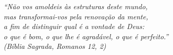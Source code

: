 \begin{epigrafe}
    \vspace*{\fill}
	\begin{flushright}
		\textit{``Não vos amoldeis às estruturas deste mundo, \\
		mas transformai-vos pela renovação da mente, \\
		a fim de distinguir qual é a vontade de Deus: \\
		o que é bom, o que lhe é agradável, o que é perfeito.''\\
		(Bíblia Sagrada, Romanos 12, 2)}
	\end{flushright}
\end{epigrafe}